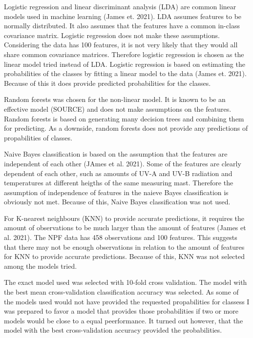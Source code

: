 \documentclass[a4size, 12pt]{report}
\begin{document}
	Logistic regression and linear discriminant analysis (LDA) are common linear models used in machine learning  (James et. 2021). LDA assumes features to be normally distributed. It also assumes that the features have a common in-class covariance matrix. Logistic regression does not make these assumptions. Considering the data has 100 features, it is not very likely that they would all share common covariance matrices. Therefore logistic regression is chosen as the linear model tried instead of LDA. Logistic regression is based on estimating the probabilities of the classes by fitting a linear model to the data  (James et. 2021). Because of this it does provide predicted probabilities for the classes.  
	  
	Random forests was chosen for the non-linear model. It is known to be an effective model (SOURCE) and does not make assumptions on the features. Random forests is based on generating many decision trees and combining them for predicting. As a downside, random forests does not provide any predictions of propabilities of classes. 
	
	Naive Bayes classification is based on the assumption that the features are independent of each other (JAmes et al. 2021). Some of the features are clearly dependent of each  other, such as amounts of UV-A and UV-B radiation and temperatures at different heigths of the same measuring mast. Therefore the assumption of independence of features in the naieve Bayes classification is obviously not met. Because of this, Naive Bayes classification was not used. 
	
	For K-nearest neighbours (KNN) to provide accurate predictions, it requires the amount of observations to be much larger than the amount of features (James et al. 2021). The NPF data has 458 observations and 100 features. This suggests that there may not be enough observations in relation to the amount of features for KNN to provide accurate predictions. Because of this, KNN was not selected among the models tried.   

	The exact model used was selected with 10-fold cross validation. The model with the best mean cross-validation classification accuracy was selected. As some of the models used would not have provided the requested propabilities for classess I was prepared to favor a model that provides those probabilities if two or more models would be close to a equal peerformance. It turned out however, that the model with the best cross-validation accuracy provided the probabilities.  
		
\end{document}
